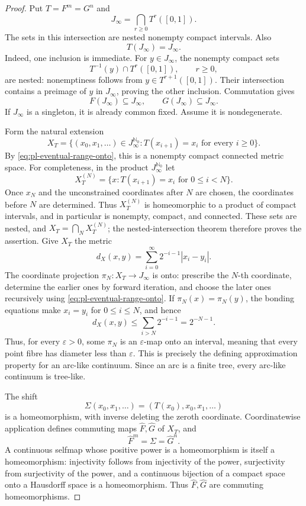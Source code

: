 \documentclass[11pt]{article}
\theoremstyle{definition}
\theoremstyle{remark}
\newcommand{\I}{[0,1]}
\begin{document}
\begin{proof}
Put \(T=F^m=G^n\) and
\[
 J_\infty=\bigcap_{r\geq0}T^r(\I).
\]
The sets in this intersection are nested nonempty compact intervals.  Also
\begin{equation}\label{eq:pl-eventual-range-onto}
 T(J_\infty)=J_\infty.
\end{equation}
Indeed, one inclusion is immediate.  For \(y\in J_\infty\), the nonempty
compact sets
\[
 T^{-1}(y)\cap T^r(\I),\qquad r\geq0,
\]
are nested: nonemptiness follows from \(y\in T^{r+1}(\I)\).  Their
intersection contains a preimage of \(y\) in \(J_\infty\), proving the other
inclusion.  Commutation gives
\[
 F(J_\infty)\subseteq J_\infty,\qquad
 G(J_\infty)\subseteq J_\infty.
\]
If \(J_\infty\) is a singleton, it is already common fixed.  Assume it is
nondegenerate.

Form the natural extension
\[
 X_T=\{(x_0,x_1,\ldots)\in J_\infty^{\mathbb N_0}:
       T(x_{i+1})=x_i\text{ for every }i\geq0\}.
\]
By \eqref{eq:pl-eventual-range-onto}, this is a nonempty compact
connected metric space.  For completeness, in the product
\(J_\infty^{\mathbb N_0}\) let
\[
 X_T^{(N)}=\{x:T(x_{i+1})=x_i\text{ for }0\leq i<N\}.
\]
Once \(x_N\) and the unconstrained coordinates after \(N\) are chosen, the
coordinates before \(N\) are determined.  Thus \(X_T^{(N)}\) is homeomorphic
to a product of compact intervals, and in particular is nonempty, compact,
and connected.  These sets are nested, and
\(X_T=\bigcap_NX_T^{(N)}\); the nested-intersection theorem therefore proves
the assertion.  Give \(X_T\) the metric
\[
 d_X(x,y)=\sum_{i=0}^{\infty}2^{-i-1}|x_i-y_i|.
\]
The coordinate projection \(\pi_N\colon X_T\to J_\infty\) is onto: prescribe
the \(N\)-th coordinate, determine the earlier ones by forward iteration,
and choose the later ones recursively using
\eqref{eq:pl-eventual-range-onto}.  If
\(\pi_N(x)=\pi_N(y)\), the bonding equations make \(x_i=y_i\) for
\(0\leq i\leq N\), and hence
\[
 d_X(x,y)\leq\sum_{i>N}2^{-i-1}=2^{-N-1}.
\]
Thus, for every \(\varepsilon>0\), some \(\pi_N\) is an
\(\varepsilon\)-map onto an interval, meaning that every point fibre has
diameter less than \(\varepsilon\).  This is precisely the defining
approximation property for an arc-like continuum.  Since an arc is a finite
tree, every arc-like continuum is tree-like.

The shift
\[
 \Sigma(x_0,x_1,\ldots)=(T(x_0),x_0,x_1,\ldots)
\]
is a homeomorphism, with inverse deleting the zeroth coordinate.
Coordinatewise application defines commuting maps \(\widehat F,\widehat G\)
of \(X_T\), and
\[
 \widehat F^m=\Sigma=\widehat G^n.
\]
A continuous selfmap whose positive power is a homeomorphism is itself a
homeomorphism: injectivity follows from injectivity of the power, surjectivity
from surjectivity of the power, and a continuous bijection of a compact space
onto a Hausdorff space is a homeomorphism.  Thus \(\widehat F,\widehat G\)
are commuting homeomorphisms.


\end{proof}
\end{document}
